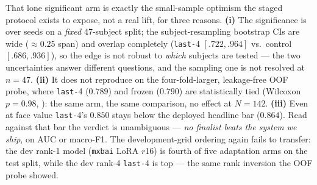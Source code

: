 \documentclass[conference]{IEEEtran}
\begin{document}
That lone significant arm is exactly the small-sample optimism the staged protocol
exists to expose, not a real lift, for three reasons. \textbf{(i)} The significance
is over seeds on a \emph{fixed} 47-subject split; the subject-resampling bootstrap
CIs are wide ($\approx\!0.25$ span) and overlap completely (\texttt{last-}4
$[.722,.964]$ vs.\ control $[.686,.936]$), so the edge is not robust to \emph{which}
subjects are tested --- the two uncertainties answer different questions, and the
sampling one is not resolved at $n\!=\!47$. \textbf{(ii)} It does not reproduce on
the four-fold-larger, leakage-free OOF probe, where \texttt{last-}4 ($0.789$) and
frozen ($0.790$) are statistically tied (Wilcoxon $p=0.98$,
): the same arm, the same comparison, no effect at
$N\!=\!142$. \textbf{(iii)} Even at face value \texttt{last-}4's $0.850$ stays below
the deployed headline bar ($0.864$). Read against that bar the verdict is
unambiguous --- \emph{no finalist beats the system we ship}, on AUC or macro-F1.
The development-grid ordering again fails to transfer: the dev rank-1 model
(\texttt{mxbai} LoRA $r$16) is fourth of five adaptation arms on the test split,
while the dev rank-4 \texttt{last-}4 is top --- the same rank inversion the OOF
probe showed.
\end{document}
